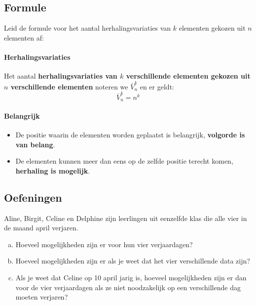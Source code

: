 \documentclass[12pt,twoside]{article}
\begin{document}
\begin{theorie}
\pagebreak
\subsection{Formule}

Leid de formule voor het aantal herhalingsvariaties van $k$ elementen gekozen uit $n$ elementen af:

\paragraph*{Herhalingsvariaties}
\begin{mdframed}
Het aantal {\bf herhalingsvariaties van $k$ verschillende elementen gekozen uit $n$ verschillende elementen} noteren we $\bar{V}^k_n$ en er geldt:
$$\bar{V}^k_n=n^k$$
\end{mdframed}

\paragraph*{Belangrijk}
\begin{itemize}
  \item De positie waarin de elementen worden geplaatst is belangrijk, {\bf volgorde is van belang}.
  \item De elementen kunnen meer dan eens op de zelfde positie terecht komen, {\bf herhaling is mogelijk}.
\end{itemize}

\pagebreak
\subsection{Oefeningen}

\end{theorie}

\begin{oefening}
Aline, Birgit, Celine en Delphine zijn leerlingen uit eenzelfde klas die alle vier in de maand april verjaren.
\begin{enumerate}[(a)]
  \item Hoeveel mogelijkheden zijn er voor hun vier verjaardagen?
  \item Hoeveel mogelijkheden zijn er als je weet dat het vier verschillende data zijn?
  \item Als je weet dat Celine op 10 april jarig is, hoeveel mogelijkheden zijn er dan voor de vier verjaardagen als ze niet noodzakelijk op een verschillende dag moeten verjaren?
\end{enumerate}
\end{oefening}
\end{document}
